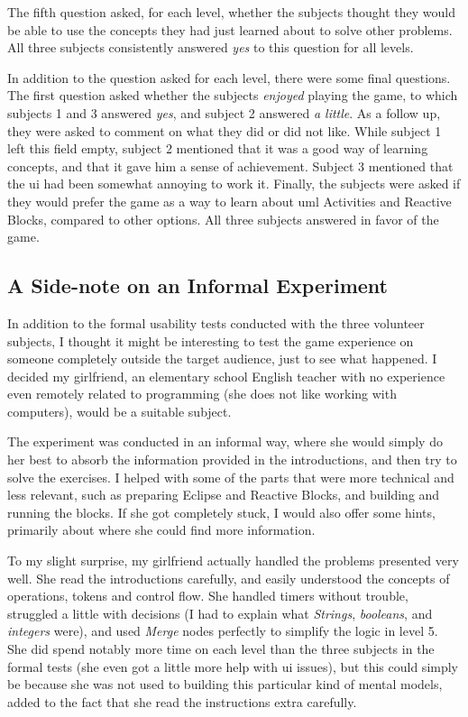 \noindent
The fifth question asked, for each level, whether the subjects thought they would be able to use the concepts they had just learned about to solve other problems. All three subjects consistently answered \emph{yes} to this question for all levels.

\noindent
In addition to the question asked for each level, there were some final questions. The first question asked whether the subjects \emph{enjoyed} playing the game, to which subjects 1 and 3 answered \emph{yes}, and subject 2 answered \emph{a little}. As a follow up, they were asked to comment on what they did or did not like. While subject 1 left this field empty, subject 2 mentioned that it was a good way of learning concepts, and that it gave him a sense of achievement. Subject 3 mentioned that the \gls{ui} had been somewhat annoying to work it. Finally, the subjects were asked if they would prefer the game as a way to learn about \gls{uml} Activities and Reactive Blocks, compared to other options. All three subjects answered in favor of the game.

\subsection{A Side-note on an Informal Experiment}
\label{sec:game_testing_sidenote}
In addition to the formal usability tests conducted with the three volunteer subjects, I thought it might be interesting to test the game experience on someone completely outside the target audience, just to see what happened. I decided my girlfriend, an elementary school English teacher with no experience even remotely related to programming (she does not like working with computers), would be a suitable subject.

\noindent
The experiment was conducted in an informal way, where she would simply do her best to absorb the information provided in the introductions, and then try to solve the exercises. I helped with some of the parts that were more technical and less relevant, such as preparing Eclipse and Reactive Blocks, and building and running the blocks. If she got completely stuck, I would also offer some hints, primarily about where she could find more information.

\noindent
To my slight surprise, my girlfriend actually handled the problems presented very well. She read the introductions carefully, and easily understood the concepts of operations, tokens and control flow. She handled timers without trouble, struggled a little with decisions (I had to explain what \emph{Strings}, \emph{booleans}, and \emph{integers} were), and used \emph{Merge} nodes perfectly to simplify the logic in level 5. She did spend notably more time on each level than the three subjects in the formal tests (she even got a little more help with \gls{ui} issues), but this could simply be because she was not used to building this particular kind of mental models, added to the fact that she read the instructions extra carefully.

